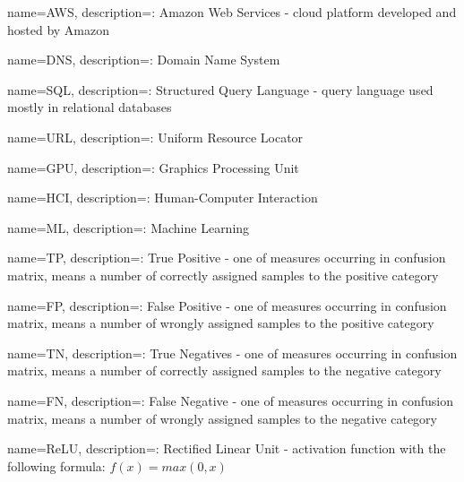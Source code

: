 {
name=AWS,
description={: Amazon Web Services - cloud platform developed and hosted by Amazon}
}

{
name=DNS,
description={: Domain Name System}
}

{
name=SQL,
description={: Structured Query Language - query language used mostly in relational databases}
}

{
name=URL,
description={: Uniform Resource Locator}
}

{
name=GPU,
description={: Graphics Processing Unit}
}

{
name=HCI,
description={: Human-Computer Interaction}
}

{
name=ML,
description={: Machine Learning}
}

{
name=TP,
description={: True Positive - one of measures occurring in confusion matrix, means a number of correctly assigned samples to the positive category}
}

{
name=FP,
description={: False Positive - one of measures occurring in confusion matrix, means a number of wrongly assigned samples to the positive category}
}

{
name=TN,
description={: True Negatives - one of measures occurring in confusion matrix, means a number of correctly assigned samples to the negative category}
}

{
name=FN,
description={: False Negative - one of measures occurring in confusion matrix, means a number of wrongly assigned samples to the negative category}
}

{
name=ReLU,
description={: Rectified Linear Unit - activation function with the following formula: $f(x)=max(0, x)$}
}

